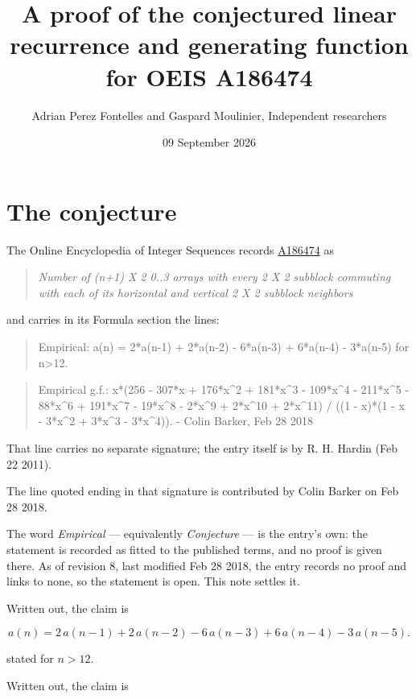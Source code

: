 \documentclass[11pt]{article}
\title{A proof of the conjectured linear recurrence and generating function for OEIS A186474}
\author{Adrian Perez Fontelles and Gaspard Moulinier, Independent researchers}
\date{09 September 2026}
\theoremstyle{definition}
\begin{document}
\maketitle
\section{The conjecture}

The Online Encyclopedia of Integer Sequences records \href{https://oeis.org/A186474}{A186474} as

\begin{quote}\itshape Number of (n+1) X 2 0..3 arrays with every 2 X 2 subblock commuting with each of its horizontal and vertical 2 X 2 subblock neighbors\end{quote}

and carries in its Formula section the lines:

\begin{quote}\ttfamily Empirical: a(n) = 2*a(n-1) + 2*a(n-2) - 6*a(n-3) + 6*a(n-4) - 3*a(n-5) for n>12.\end{quote}

\begin{quote}\ttfamily Empirical g.f.: x*(256 - 307*x + 176*x\textasciicircum{}2 + 181*x\textasciicircum{}3 - 109*x\textasciicircum{}4 - 211*x\textasciicircum{}5 - 88*x\textasciicircum{}6 + 191*x\textasciicircum{}7 - 19*x\textasciicircum{}8 - 2*x\textasciicircum{}9 + 2*x\textasciicircum{}10 + 2*x\textasciicircum{}11) / ((1 - x)*(1 - x - 3*x\textasciicircum{}2 + 3*x\textasciicircum{}3 - 3*x\textasciicircum{}4)). - Colin Barker, Feb 28 2018\end{quote}

That line carries no separate signature; the entry itself is by R. H. Hardin (Feb 22 2011).

The line quoted ending in that signature is contributed by Colin Barker on Feb 28 2018.

The word {\itshape Empirical} --- equivalently {\itshape Conjecture} --- is the entry's own: the statement is recorded as fitted to the published terms, and no proof is given there. As of revision 8, last modified Feb 28 2018, the entry records no proof and links to none, so the statement is open. This note settles it.

Written out, the claim is

\[a(n) = 2\,a(n-1) + 2\,a(n-2) - 6\,a(n-3) + 6\,a(n-4) - 3\,a(n-5).\]

stated for $n > 12$.

Written out, the claim is
\end{document}
